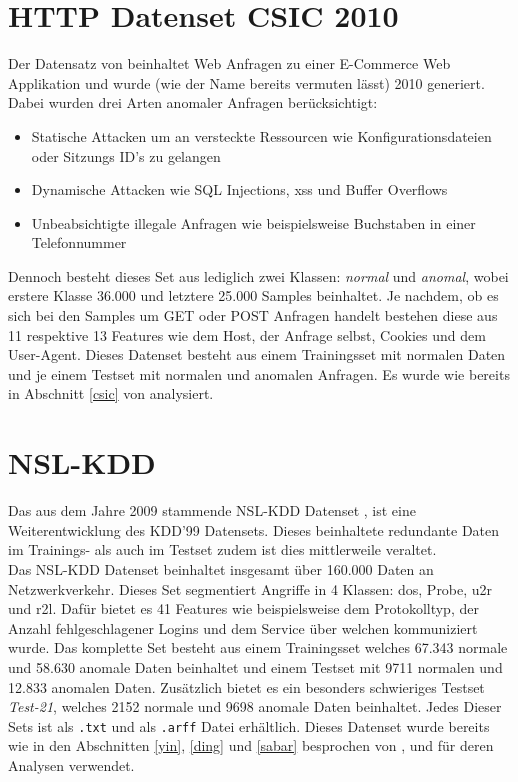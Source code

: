 \documentclass[
    12pt, %
    DIV10,
    ngerman, %
    a4paper, %
    oneside, %
    titlepage, %
    parskip=half, %
    headings=normal, %
    listof=totoc, %
    bibliography=totoc, %
    index=totoc, %
    captions=tableheading, %
    final %
]{scrreprt}
\begin{document}
\section{HTTP Datenset CSIC 2010}
Der Datensatz von \textcite{csic} beinhaltet Web Anfragen zu einer E-Commerce Web Applikation und wurde (wie der Name bereits vermuten lässt) 2010 generiert. Dabei wurden drei Arten anomaler Anfragen berücksichtigt:
\begin{itemize}
\item Statische Attacken um an versteckte Ressourcen wie Konfigurationsdateien oder Sitzungs ID's zu gelangen
\item Dynamische Attacken wie SQL Injections, \ac{xss} und Buffer Overflows
\item Unbeabsichtigte illegale Anfragen wie beispielsweise Buchstaben in einer Telefonnummer 
\end{itemize}
Dennoch besteht dieses Set aus lediglich zwei Klassen: \emph{normal} und \emph{anomal}, wobei erstere Klasse 36.000 und letztere 25.000 Samples beinhaltet.
Je nachdem, ob es sich bei den Samples um GET oder POST Anfragen handelt bestehen diese aus 11 respektive 13 Features wie dem Host, der Anfrage selbst, Cookies und dem User-Agent. Dieses Datenset besteht aus einem Trainingsset mit normalen Daten und je einem Testset mit normalen und anomalen Anfragen. Es wurde wie bereits in Abschnitt \ref{csic} von \textcite{Pham2016} analysiert.
\section{NSL-KDD}
Das aus dem Jahre 2009 stammende NSL-KDD Datenset \parencite{Cybersecurity}, ist eine Weiterentwicklung des KDD'99 Datensets. Dieses beinhaltete redundante Daten im Trainings- als auch im Testset zudem ist dies mittlerweile veraltet.\\
Das NSL-KDD Datenset beinhaltet insgesamt über 160.000 Daten an Netzwerkverkehr. Dieses Set segmentiert Angriffe in 4 Klassen: \ac{dos}, Probe, \ac{u2r} und \ac{r2l}. Dafür bietet es 41 Features wie beispielsweise dem Protokolltyp, der Anzahl fehlgeschlagener Logins und dem Service über welchen kommuniziert wurde. Das komplette Set besteht aus einem Trainingsset welches 67.343 normale und 58.630 anomale Daten beinhaltet und einem Testset mit 9711 normalen und 12.833 anomalen Daten. Zusätzlich bietet es ein besonders schwieriges Testset \emph{Test-21}, welches 2152 normale und 9698 anomale Daten beinhaltet. Jedes Dieser Sets ist als \texttt{.txt} und als \texttt{.arff} Datei erhältlich.
Dieses Datenset wurde bereits wie in den Abschnitten \ref{yin}, \ref{ding} und \ref{sabar} besprochen von \textcite{Yin2017}, \textcite{Ding2018} und \textcite{Sabar2018} für deren Analysen verwendet.
\end{document}
